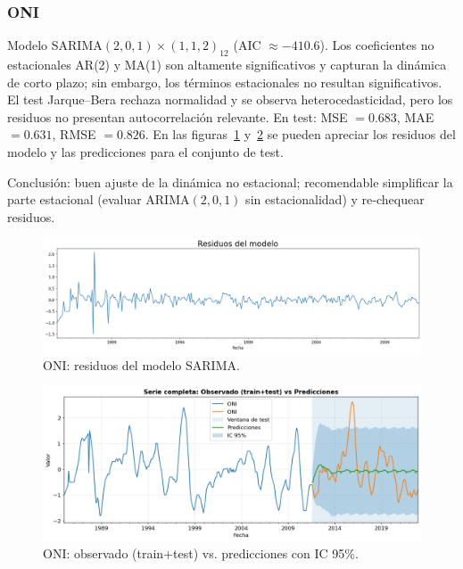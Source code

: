 \subsubsection{ONI} 
Modelo SARIMA$(2,0,1)\times(1,1,2)_{12}$ (AIC $\approx -410.6$). 
Los coeficientes no estacionales AR(2) y MA(1) son altamente significativos y capturan la
dinámica de corto plazo; sin embargo, los términos estacionales no resultan
significativos. El test Jarque--Bera rechaza normalidad y se observa heterocedasticidad,
pero los residuos no presentan autocorrelación relevante. En test: 
MSE $=0.683$, MAE $=0.631$, RMSE $=0.826$. En las figuras~\ref{fig:res_oni} y~\ref{fig:pred_oni} se pueden apreciar los residuos del modelo y las predicciones para el conjunto de test.

Conclusión: buen ajuste de la dinámica no estacional; recomendable
simplificar la parte estacional (evaluar ARIMA$(2,0,1)$ sin estacionalidad) y re‐chequear
residuos.
\vspace{0.3em}

\begin{figure}[H]\centering
\includegraphics[scale=.30]{Figures/res_sarima_oni.png}
\caption{ONI: residuos del modelo SARIMA.}
\label{fig:res_oni}
\end{figure}

\begin{figure}[H]\centering
\includegraphics[scale=.42]{Figures/pred_oni.png}
\caption{ONI: observado (train+test) vs. predicciones con IC 95\%.}
\label{fig:pred_oni}
\end{figure}


